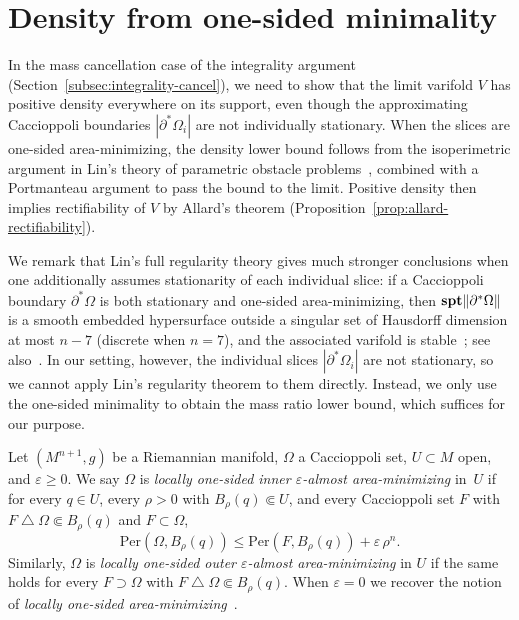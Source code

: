 
\section{Density from one-sided minimality}\label{sec:one-sided-density}

In the mass cancellation case of the integrality argument (Section~\ref{subsec:integrality-cancel}), we need to show that the limit varifold $V$ has positive density everywhere on its support, even though the approximating Caccioppoli boundaries $|\partial^*\Omega_i|$ are not individually stationary. When the slices are one-sided area-minimizing, the density lower bound follows from the isoperimetric argument in Lin's theory of parametric obstacle problems~\cite{Lin85}, combined with a Portmanteau argument to pass the bound to the limit. Positive density then implies rectifiability of $V$ by Allard's theorem (Proposition~\ref{prop:allard-rectifiability}).

We remark that Lin's full regularity theory gives much stronger conclusions when one additionally assumes stationarity of each individual slice: if a Caccioppoli boundary $\partial^*\Omega$ is both stationary and one-sided area-minimizing, then $\mathbf{spt}\|\partial^*\Omega\|$ is a smooth embedded hypersurface outside a singular set of Hausdorff dimension at most $n - 7$ (discrete when $n = 7$), and the associated varifold is stable~\cite[Interior Regularity Theorem, \S0.2]{Lin85}; see also~\cite[Proposition~2.1]{Liu19}. In our setting, however, the individual slices $|\partial^*\Omega_i|$ are not stationary, so we cannot apply Lin's regularity theorem to them directly. Instead, we only use the one-sided minimality to obtain the mass ratio lower bound, which suffices for our purpose.


\begin{definition}\label{def:one-sided-perimeter-min}
Let $(M^{n+1}, g)$ be a Riemannian manifold, $\Omega$ a Caccioppoli set, $U \subset M$ open, and $\varepsilon \geq 0$.
We say $\Omega$ is \emph{locally one-sided inner $\varepsilon$-almost area-minimizing} in~$U$ if for every $q \in U$, every $\rho > 0$ with $B_\rho(q) \Subset U$, and every Caccioppoli set $F$ with $F \mathbin{\triangle} \Omega \Subset B_\rho(q)$ and $F \subset \Omega$,
\[
    \mathrm{Per}(\Omega, B_\rho(q)) \leq \mathrm{Per}(F, B_\rho(q)) + \varepsilon\,\rho^n.
\]
Similarly, $\Omega$ is \emph{locally one-sided outer $\varepsilon$-almost area-minimizing} in $U$ if the same holds for every $F \supset \Omega$ with $F \mathbin{\triangle} \Omega \Subset B_\rho(q)$.
When $\varepsilon = 0$ we recover the notion of \emph{locally one-sided area-minimizing}~\cite[Definition~1.10]{CLS22}.
\end{definition}

